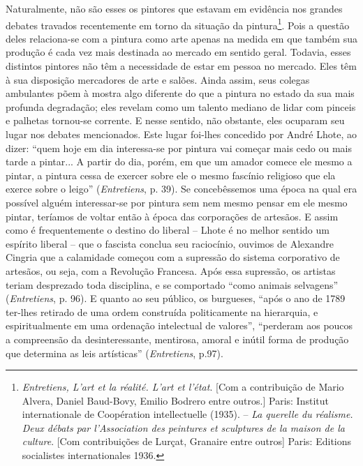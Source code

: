 Naturalmente, não são esses os pintores que estavam em evidência nos
grandes debates travados recentemente em torno da situação da
pintura\footnote{\emph{Entretiens, L'art et la réalité. L'art et
  l'état}. {[}Com a contribuição de Mario Alvera, Daniel Baud-Bovy,
  Emilio Bodrero entre outros.{]} Paris: Institut internationale de
  Coopération intellectuelle (1935). -- \emph{La querelle du réalisme.
  Deux débats par l'Association des peintures et sculptures de la maison
  de la culture}. {[}Com contribuições de Lurçat, Granaire entre
  outros{]} Paris: Editions socialistes internationales 1936.}. Pois a
questão deles relaciona-se com a pintura como arte apenas na medida em
que também sua produção é cada vez mais destinada ao mercado em sentido
geral. Todavia, esses distintos pintores não têm a necessidade de estar
em pessoa no mercado. Eles têm à sua disposição mercadores de arte e
salões. Ainda assim, seus colegas ambulantes põem à mostra algo
diferente do que a pintura no estado da sua mais profunda degradação;
eles revelam como um talento mediano de lidar com pinceis e palhetas
tornou-se corrente. E nesse sentido, não obstante, eles ocuparam seu
lugar nos debates mencionados. Este lugar foi-lhes concedido por André
Lhote, ao dizer: ``quem hoje em dia interessa-se por pintura vai começar
mais cedo ou mais tarde a pintar... A partir do dia, porém, em que um
amador comece ele mesmo a pintar, a pintura cessa de exercer sobre ele o
mesmo fascínio religioso que ela exerce sobre o leigo''
(\emph{Entretiens}, p. 39). Se concebêssemos uma época na qual era
possível alguém interessar-se por pintura sem nem mesmo pensar em ele
mesmo pintar, teríamos de voltar então à época das corporações de
artesãos. E assim como é frequentemente o destino do liberal -- Lhote é
no melhor sentido um espírito liberal -- que o fascista conclua seu
raciocínio, ouvimos de Alexandre Cingria que a calamidade começou com a
supressão do sistema corporativo de artesãos, ou seja, com a Revolução
Francesa. Após essa supressão, os artistas teriam desprezado toda
disciplina, e se comportado ``como animais selvagens''
(\emph{Entretiens}, p. 96). E quanto ao seu público, os burgueses,
``após o ano de 1789 ter-lhes retirado de uma ordem construída
politicamente na hierarquia, e espiritualmente em uma ordenação
intelectual de valores'', ``perderam aos poucos a compreensão da
desinteressante, mentirosa, amoral e inútil forma de produção que
determina as leis artísticas'' (\emph{Entretiens}, p.97).


